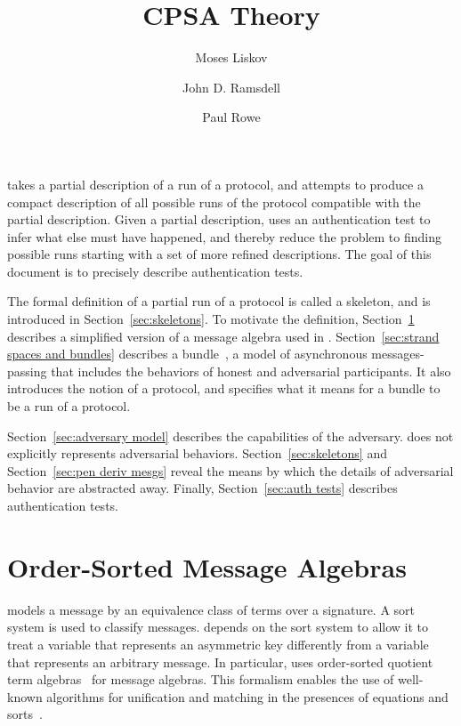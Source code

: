 \documentclass[12pt]{article}
\title{CPSA Theory}
\author{Moses Liskov\and John D. Ramsdell\and Paul Rowe}
\theoremstyle{definition}
\begin{document}
\maketitle
\cpsacopying

{\cpsa} takes a partial description of a run of a protocol, and
attempts to produce a compact description of all possible runs of the
protocol compatible with the partial description.  Given a partial
description, {\cpsa} uses an authentication test to infer what else
must have happened, and thereby reduce the problem to finding possible
runs starting with a set of more refined descriptions.  The goal of
this document is to precisely describe authentication tests.

The formal definition of a partial run of a protocol is called a
skeleton, and is introduced in Section~\ref{sec:skeletons}.  To
motivate the definition, Section~\ref{sec:order-sorted mesg algs}
describes a simplified version of a message algebra used in {\cpsa}.
Section~\ref{sec:strand spaces and bundles} describes a
bundle~\cite{ThayerEtal99,GuttmanThayer02}, a model of asynchronous
messages-passing that includes the behaviors of honest and adversarial
participants.  It also introduces the notion of a protocol, and
specifies what it means for a bundle to be a run of a protocol.

Section~\ref{sec:adversary model} describes the capabilities of the
adversary.  {\cpsa} does not explicitly represents adversarial
behaviors.  Section~\ref{sec:skeletons} and Section~\ref{sec:pen deriv
  mesgs} reveal the means by which the details of adversarial
behavior are abstracted away.  Finally, Section~\ref{sec:auth tests}
describes authentication tests.

\section{Order-Sorted Message Algebras}\label{sec:order-sorted mesg algs}

{\cpsa} models a message by an equivalence class of terms over a
signature. A sort system is used to classify messages.  {\cpsa}
depends on the sort system to allow it to treat a variable that
represents an asymmetric key differently from a variable that
represents an arbitrary message.  In particular, {\cpsa} uses
order-sorted quotient term algebras~\cite{GoguenMeseguer92} for
message algebras.  This formalism enables the use of well-known
algorithms for unification and matching in the presences of equations
and sorts~\cite[Chapter~8]{RobinsonVoronkov01}.
\end{document}
